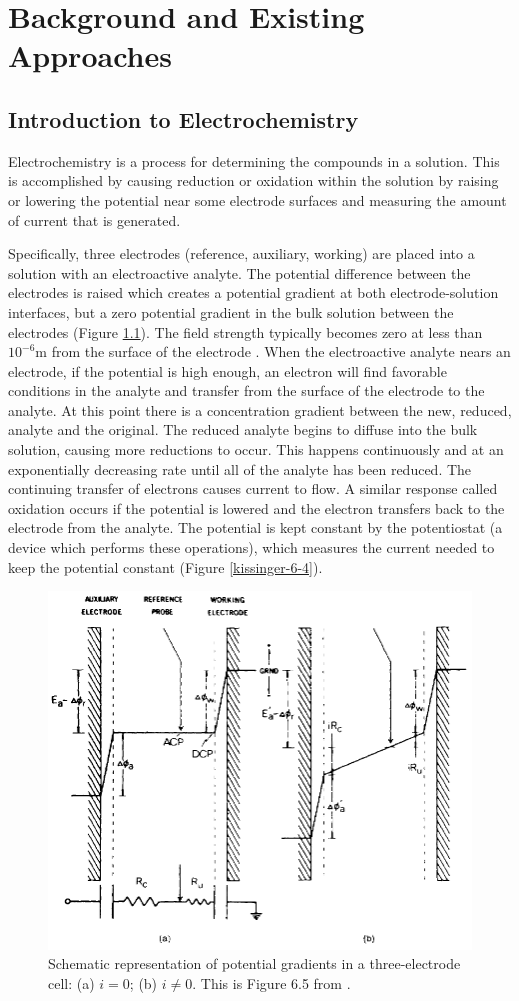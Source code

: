 \chapter{Background and Existing Approaches}

\section{Introduction to Electrochemistry}

Electrochemistry is a process for determining the compounds in a solution. This is accomplished by causing reduction or oxidation within the solution by raising or lowering the potential near some electrode surfaces and measuring the amount of current that is generated.

Specifically, three electrodes (reference, auxiliary, working) are placed into a solution with an electroactive analyte. The potential difference between the electrodes is raised which creates a potential gradient at both electrode-solution interfaces, but a zero potential gradient in the bulk solution between the electrodes (Figure \ref{kissinger-6-5}). The field strength typically becomes zero at less than $10^{-6}\mathrm{m}$ from the surface of the electrode \cite{kissinger1996fca}. When the electroactive analyte nears an electrode, if the potential is high enough, an electron will find favorable conditions in the analyte and transfer from the surface of the electrode to the analyte. At this point there is a concentration gradient between the new, reduced, analyte and the original. The reduced analyte begins to diffuse into the bulk solution, causing more reductions to occur. This happens continuously and at an exponentially decreasing rate until all of the analyte has been reduced. The continuing transfer of electrons causes current to flow. A similar response called oxidation occurs if the potential is lowered and the electron transfers back to the electrode from the analyte. The potential is kept constant by the potentiostat (a device which performs these operations), which measures the current needed to keep the potential constant (Figure \ref{kissinger-6-4}).

\begin{figure}
	\centering
	\includegraphics[width=0.5\linewidth]{figures/kissinger-6-5.png}
	\caption[Schematic representation of potential gradients in a three-electrode cell]{Schematic representation of potential gradients in a three-electrode cell: (a) $i = 0$; (b) $i \ne 0$. This is Figure 6.5 from \cite{kissinger1996iai}.}
	\label{kissinger-6-5}
\end{figure}

